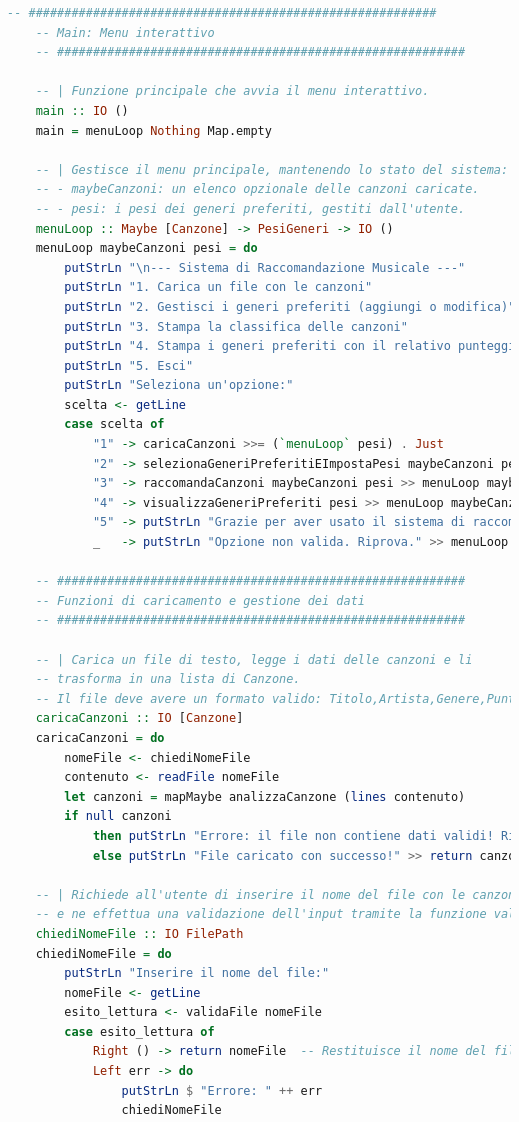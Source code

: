\documentclass[a4paper,11pt]{article}
\begin{document}
\begin{lstlisting}[language=Haskell]
    -- #########################################################
    -- Main: Menu interattivo
    -- #########################################################
    
    -- | Funzione principale che avvia il menu interattivo.
    main :: IO ()
    main = menuLoop Nothing Map.empty
    
    -- | Gestisce il menu principale, mantenendo lo stato del sistema:
    -- - maybeCanzoni: un elenco opzionale delle canzoni caricate.
    -- - pesi: i pesi dei generi preferiti, gestiti dall'utente.
    menuLoop :: Maybe [Canzone] -> PesiGeneri -> IO ()
    menuLoop maybeCanzoni pesi = do
        putStrLn "\n--- Sistema di Raccomandazione Musicale ---"
        putStrLn "1. Carica un file con le canzoni"
        putStrLn "2. Gestisci i generi preferiti (aggiungi o modifica)"
        putStrLn "3. Stampa la classifica delle canzoni"
        putStrLn "4. Stampa i generi preferiti con il relativo punteggio"
        putStrLn "5. Esci"
        putStrLn "Seleziona un'opzione:"
        scelta <- getLine
        case scelta of
            "1" -> caricaCanzoni >>= (`menuLoop` pesi) . Just
            "2" -> selezionaGeneriPreferitiEImpostaPesi maybeCanzoni pesi >>= menuLoop maybeCanzoni
            "3" -> raccomandaCanzoni maybeCanzoni pesi >> menuLoop maybeCanzoni pesi
            "4" -> visualizzaGeneriPreferiti pesi >> menuLoop maybeCanzoni pesi
            "5" -> putStrLn "Grazie per aver usato il sistema di raccomandazione. Arrivederci!"
            _   -> putStrLn "Opzione non valida. Riprova." >> menuLoop maybeCanzoni pesi
    
    -- #########################################################
    -- Funzioni di caricamento e gestione dei dati
    -- #########################################################
    
    -- | Carica un file di testo, legge i dati delle canzoni e li
    -- trasforma in una lista di Canzone.
    -- Il file deve avere un formato valido: Titolo,Artista,Genere,Punteggio.
    caricaCanzoni :: IO [Canzone]
    caricaCanzoni = do
        nomeFile <- chiediNomeFile
        contenuto <- readFile nomeFile
        let canzoni = mapMaybe analizzaCanzone (lines contenuto)
        if null canzoni
            then putStrLn "Errore: il file non contiene dati validi! Riprova." >> caricaCanzoni
            else putStrLn "File caricato con successo!" >> return canzoni
    
    -- | Richiede all'utente di inserire il nome del file con le canzoni
    -- e ne effettua una validazione dell'input tramite la funzione validaFile.
    chiediNomeFile :: IO FilePath
    chiediNomeFile = do
        putStrLn "Inserire il nome del file:"
        nomeFile <- getLine
        esito_lettura <- validaFile nomeFile
        case esito_lettura of
            Right () -> return nomeFile  -- Restituisce il nome del file se valido
            Left err -> do
                putStrLn $ "Errore: " ++ err
                chiediNomeFile
    

\end{lstlisting}
\end{document}

